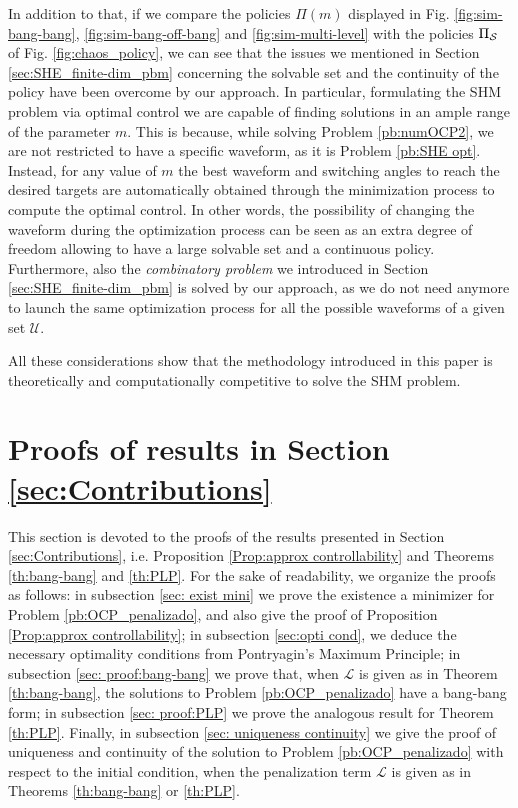 \documentclass[twocolumn]{autart}    %
\begin{document}
In addition to that, if we compare the policies $\Pi(m)$ displayed in Fig. \ref{fig:sim-bang-bang}, \ref{fig:sim-bang-off-bang} and \ref{fig:sim-multi-level} with the policies $\Pi_{\mathcal{S}}$ of Fig. \ref{fig:chaos_policy}, we can see that the issues we mentioned in Section \ref{sec:SHE_finite-dim_pbm} concerning the solvable set and the continuity of the policy have been overcome by our approach. In particular, formulating the SHM problem via optimal control we are capable of finding solutions in an ample range of the parameter $m$. This is because, while solving Problem \ref{pb:numOCP2}, we are not restricted to have a specific waveform, as it is Problem \ref{pb:SHE opt}. Instead, for any value of $m$ the best waveform and switching angles to reach the desired targets are automatically obtained through the minimization process to compute the optimal control. In other words, the possibility of changing the waveform during the optimization process can be seen as an extra degree of freedom allowing to have a large solvable set and a continuous policy. Furthermore, also the \textit{combinatory problem} we introduced in Section \ref{sec:SHE_finite-dim_pbm} is solved by our approach, as we do not need anymore to launch the same optimization process for all the possible waveforms of a given set $\mathcal U$. 

All these considerations show that the methodology introduced in this paper is theoretically and computationally competitive to solve the SHM problem.

\section{Proofs of results in Section \ref{sec:Contributions}}\label{sec:Proof}

This section is devoted to the proofs of the results presented in Section \ref{sec:Contributions}, i.e. Proposition \ref{Prop:approx controllability} and Theorems \ref{th:bang-bang} and \ref{th:PLP}.
For the sake of readability,  we organize the proofs as follows: in subsection \ref{sec: exist mini} we prove the existence a minimizer for Problem \ref{pb:OCP_penalizado},  and also give the proof of Proposition \ref{Prop:approx controllability};
in subsection \ref{sec:opti cond}, we deduce the necessary optimality conditions from Pontryagin's Maximum Principle; in subsection \ref{sec: proof:bang-bang}  we prove that, when $\mathcal{L}$ is given as in Theorem \ref{th:bang-bang}, the solutions to Problem \ref{pb:OCP_penalizado} have a bang-bang form;
in subsection \ref{sec: proof:PLP} we prove the analogous result for Theorem \ref{th:PLP}.
Finally, in subsection \ref{sec: uniqueness continuity} we give the proof of uniqueness and continuity of the solution to Problem \ref{pb:OCP_penalizado} with respect to the initial condition, when the penalization term $\mathcal{L}$ is given as in Theorems \ref{th:bang-bang} or \ref{th:PLP}.
\end{document}
